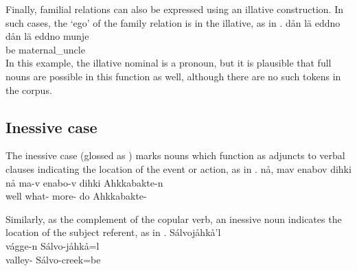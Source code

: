 Finally, familial relations can also be expressed using an illative construction. In such cases, the ‘ego’ of the family relation is in the illative, as in .
\ea\label{ill5}
\glll	dån lä eddno  \\
	dån lä eddno munje\\
	 be\BS{} maternal\_uncle\BS{}  \\%
\z
In this example, the illative nominal is a pronoun, but it is plausible that full nouns are possible in this function as well, although there are no such tokens in the corpus.


\subsection{Inessive case}\label{inessive}
The inessive case (glossed as \INESSs) marks nouns which function as adjuncts to verbal clauses indicating the location of the event or action, as in . 
\ea\label{iness1}
\glll	nå, mav enabov dihki  \\
	nå ma-v enabo-v dihki Ahkkabakte-n \\
	well what- more- do\BS{} Ahkkabakte- \\\nopagebreak
{} 
\z

Similarly, as the complement of the copular verb, an inessive noun indicates the location of the subject referent, as in .
\ea\label{iness2}
\glll	{} Sálvojåhkå'l\\
	vágge-n Sálvo-jåhkå=l\\
	valley- Sálvo-creek\BS{}=be\BS{}\\\nopagebreak
{} 
\z

